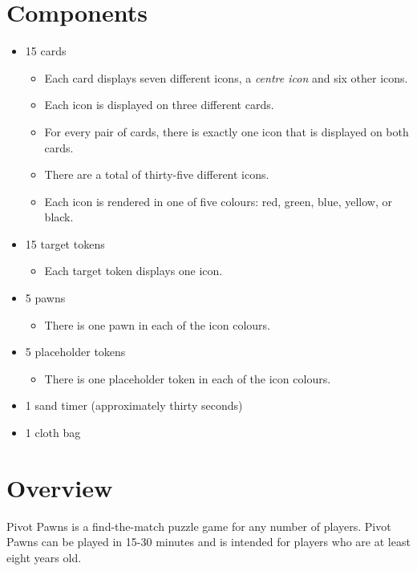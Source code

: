 \documentclass[a6paper, parskip=half, DIV=14, 10pt]{scrartcl}
\begin{document}
\section*{Components}
\begin{itemize}[leftmargin=*, noitemsep]
	\item 15 cards
      \begin{itemize}[leftmargin=*]
        \item Each card displays seven different icons, a \emph{centre icon} and six other icons.%
        \item Each icon is displayed on three different cards.
        \item For every pair of cards, there is exactly one icon that is displayed on both cards.
        \item There are a total of thirty-five different icons.
        \item Each icon is rendered in one of five colours: red, green, blue, yellow, or black.
      \end{itemize}
    \item 15 target tokens
    \begin{itemize}[leftmargin=*]
      \item Each target token displays one icon.
    \end{itemize}
  \item 5 pawns
      \begin{itemize}[leftmargin=*]
        \item There is one pawn in each of the icon colours.
      \end{itemize}
  \item 5 placeholder tokens
      \begin{itemize}[leftmargin=*]
        \item There is one placeholder token in each of the icon colours.
      \end{itemize}
  \item 1 sand timer (approximately thirty seconds)
  \item 1 cloth bag
\end{itemize}

\newpage

\section*{Overview}
Pivot Pawns is a find-the-match puzzle game for any number of players. Pivot Pawns can be played in 15-30 minutes and is intended for players who are at least eight years old.
\end{document}
